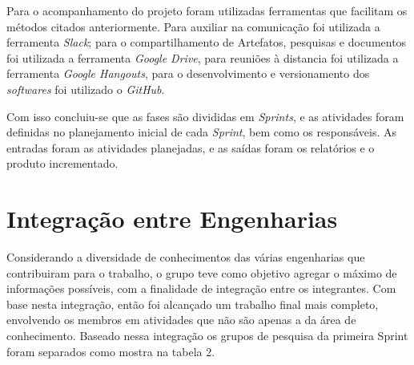 Para o acompanhamento do projeto foram utilizadas ferramentas que facilitam os métodos citados anteriormente. Para auxiliar na comunicação foi utilizada a ferramenta \textit{Slack}; para o compartilhamento de Artefatos, pesquisas e documentos foi utilizada a ferramenta \textit{Google Drive}, para reuniões à distancia foi utilizada a ferramenta \textit{Google Hangouts}, para o desenvolvimento e versionamento dos \textit{softwares} foi utilizado o \textit{GitHub}.

Com isso concluiu-se que as fases são divididas em \textit{Sprints}, e as atividades foram definidas no planejamento inicial de cada \textit{Sprint}, bem como os responsáveis. As entradas foram as atividades planejadas, e as saídas foram os relatórios e o produto incrementado.

\section{Integração entre Engenharias}

Considerando a diversidade de conhecimentos das várias engenharias que contribuiram para o trabalho, o grupo teve como objetivo agregar o máximo de informações possíveis, com a finalidade de integração entre os integrantes. Com base nesta integração, então foi alcançado um trabalho final mais completo, envolvendo os membros em atividades que não são apenas a da área de conhecimento. Baseado nessa integração os grupos de pesquisa da primeira Sprint foram separados como mostra na tabela 2.

